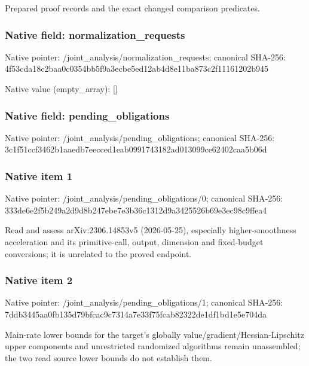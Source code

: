 \documentclass[10pt,a4paper]{article}
\begin{document}
\begingroup\raggedright\sloppy Prepared proof records and the exact changed comparison predicates.\par\endgroup

\subsubsection{Native field: normalization\_\allowbreak{}requests}
Native pointer: /joint\_\allowbreak{}analysis/normalization\_\allowbreak{}requests; canonical SHA-256: 4f53cda18c2baa0c0354bb5f9a3ecbe5ed12ab4d8e11ba873c2f11161202b945

Native value (empty\_\allowbreak{}array): []

\subsubsection{Native field: pending\_\allowbreak{}obligations}
Native pointer: /joint\_\allowbreak{}analysis/pending\_\allowbreak{}obligations; canonical SHA-256: 3c1f51ccf3462b1aaedb7eecced1eab0991743182ad013099ce62402caa5b06d

\subsubsection{Native item 1}
Native pointer: /joint\_\allowbreak{}analysis/pending\_\allowbreak{}obligations/0; canonical SHA-256: 333de6e2f5b249a2d9d8b247ebe7e3b36c1312d9a3425526b69e3ec98c9ffea4

\begingroup\raggedright\sloppy Read and assess arXiv:\allowbreak{}2306.14853v5 (2026-05-25),\allowbreak{} especially higher-smoothness acceleration and its primitive-call,\allowbreak{} output,\allowbreak{} dimension and fixed-budget conversions;\allowbreak{} it is unrelated to the proved endpoint.\par\endgroup

\subsubsection{Native item 2}
Native pointer: /joint\_\allowbreak{}analysis/pending\_\allowbreak{}obligations/1; canonical SHA-256: 7ddb3445aa0fb135d79bfcac9c7314a7e33f75fcab82322de1df1bd1e5e704da

\begingroup\raggedright\sloppy Main-rate lower bounds for the target's globally value/\allowbreak{}gradient/\allowbreak{}Hessian-Lipschitz upper components and unrestricted randomized algorithms remain unassembled;\allowbreak{} the two read source lower bounds do not establish them.\par\endgroup
\end{document}
